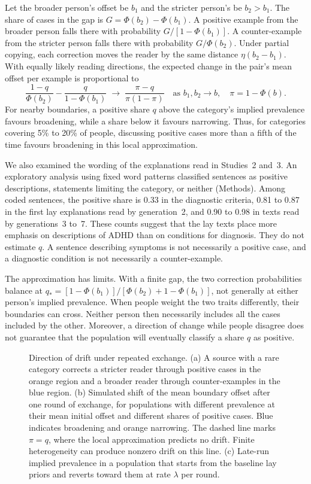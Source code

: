 \documentclass[11pt]{article}
\begin{document}
Let the broader person's offset be $b_1$ and the stricter person's be $b_2>b_1$. The share of cases in the gap is $G=\Phi(b_2)-\Phi(b_1)$. A positive example from the broader person falls there with probability $G/[1-\Phi(b_1)]$. A counter-example from the stricter person falls there with probability $G/\Phi(b_2)$. Under partial copying, each correction moves the reader by the same distance $\eta(b_2-b_1)$. With equally likely reading directions, the expected change in the pair's mean offset per example is proportional to
\begin{equation}
\frac{1-q}{\Phi(b_2)}-\frac{q}{1-\Phi(b_1)}
\;\longrightarrow\;
\frac{\pi-q}{\pi(1-\pi)}
\quad\text{as }b_1,b_2\to b,\quad\pi=1-\Phi(b).
\label{eq:drift}
\end{equation}
For nearby boundaries, a positive share $q$ above the category's implied prevalence favours broadening, while a share below it favours narrowing. Thus, for categories covering 5\% to 20\% of people, discussing positive cases more than a fifth of the time favours broadening in this local approximation.

We also examined the wording of the explanations read in Studies~2 and~3. An exploratory analysis using fixed word patterns classified sentences as positive descriptions, statements limiting the category, or neither (Methods). Among coded sentences, the positive share is 0.33 in the diagnostic criteria, 0.81 to 0.87 in the first lay explanations read by generation~2, and 0.90 to 0.98 in texts read by generations~3 to~7. These counts suggest that the lay texts place more emphasis on descriptions of ADHD than on conditions for diagnosis. They do not estimate $q$. A sentence describing symptoms is not necessarily a positive case, and a diagnostic condition is not necessarily a counter-example.

The approximation has limits. With a finite gap, the two correction probabilities balance at $q_*=[1-\Phi(b_1)]/[\Phi(b_2)+1-\Phi(b_1)]$, not generally at either person's implied prevalence. When people weight the two traits differently, their boundaries can cross. Neither person then necessarily includes all the cases included by the other. Moreover, a direction of change while people disagree does not guarantee that the population will eventually classify a share $q$ as positive.

\begin{figure}[tbp]
\centering
\resizebox{\textwidth}{!}{\figasym}
\caption{Direction of drift under repeated exchange. (a) A source with a rare category corrects a stricter reader through positive cases in the orange region and a broader reader through counter-examples in the blue region. (b) Simulated shift of the mean boundary offset after one round of exchange, for populations with different prevalence at their mean initial offset and different shares of positive cases. Blue indicates broadening and orange narrowing. The dashed line marks $\pi = q$, where the local approximation predicts no drift. Finite heterogeneity can produce nonzero drift on this line. (c) Late-run implied prevalence in a population that starts from the baseline lay priors and reverts toward them at rate $\lambda$ per round.}
\label{fig:drift}
\end{figure}
\end{document}
